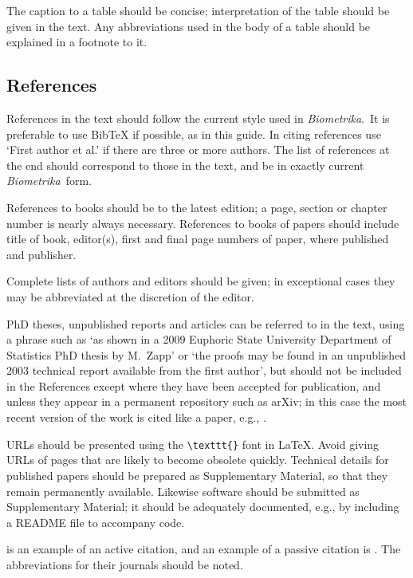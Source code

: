 \documentclass[lineno]{biometrika}
\def\Bka{{\it Biometrika}}
\begin{document}
The caption to a table should be concise; interpretation of the table should be given in the text. Any abbreviations used in the body of a table should be explained in a footnote to it.



\subsection{References}

References in the text should follow the current style used in \Bka.\ It is preferable to use BibTeX
if possible, as in this guide.  In citing
references use `First author et al.' if there are three or more authors. The list of references at
the end should correspond to those in the text, and be in exactly current \Bka\
form.

References to books should be to the latest edition; a page, section or chapter number
is nearly always necessary. References to books of papers should include title of book,
editor(s), first and final page numbers of paper, where published and publisher.

Complete lists of authors and editors should be given; in exceptional cases they may be abbreviated at the discretion of the editor.

PhD theses, unpublished reports and articles can be referred to in the text, using a phrase such as `as shown in a 2009 Euphoric State University Department of Statistics PhD thesis by M.~Zapp' or `the proofs may be found in an unpublished 2003 technical report available from the first author', but should not be included in the References except where they have been accepted for publication, and unless they appear in a permanent repository such as arXiv; in this case the most recent version of the work is cited like a paper, e.g., \citet{Berrendero.etal:2015}.

 URLs should be presented using the \verb;\texttt{}; font in LaTeX. Avoid giving URLs of pages that are likely
to become obsolete quickly.  Technical details for published papers should be prepared as Supplementary Material, so that they remain permanently available. Likewise software should be submitted as Supplementary Material; it should be adequately documented, e.g., by including a README file to accompany code.

\citet{Cox:1972} is an example of an active citation, and an example of a passive citation is  \citep{Hear:Holm:Step:quan:2006}.  The abbreviations for their journals should be noted.
\end{document}
